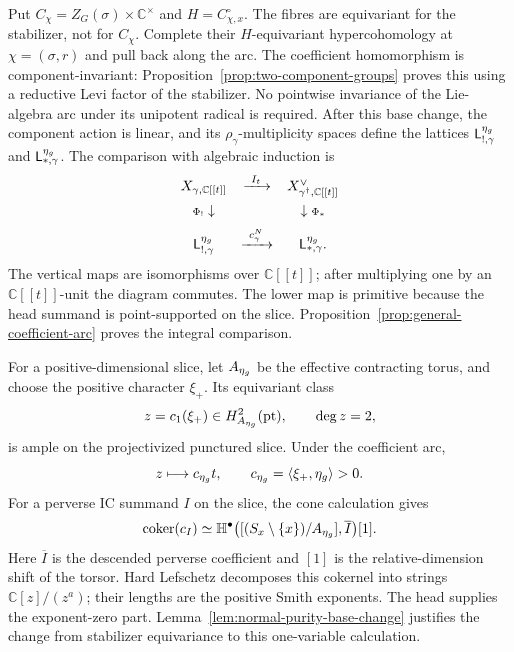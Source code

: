 \documentclass[10pt,a4paper]{amsart}
\newcommand{\C}{\mathbb C}
\newcommand{\A}{\C[[t]]}
\begin{document}
Put $C_\chi=Z_G(\sigma)\times\mathbb C^\times$ and
$H=C_{\chi,x}^\circ$.  The fibres are equivariant for the stabilizer,
not for $C_\chi$.  Complete their $H$-equivariant hypercohomology at
$\chi=(\sigma,r)$ and pull back along the arc.  The coefficient homomorphism
is component-invariant: Proposition~\ref{prop:two-component-groups}
proves this using a reductive Levi factor of the stabilizer.  No
pointwise invariance of the Lie-algebra arc under its unipotent radical
is required.  After this base change,
the component action is linear, and its $\rho_\gamma$-multiplicity
spaces define the lattices
$\mathsf L_{!,\gamma}^{\eta_{\rm g}}$ and
$\mathsf L_{*,\gamma}^{\eta_{\rm g}}$.
The comparison with algebraic induction is
\begin{equation}\label{eq:master-comparison}
\begin{array}{ccc}
 X_{\gamma,\A}&\xrightarrow{\ I_t\ }&X_{\gamma^\dagger,\A}^{\vee}\\[2mm]
 {\scriptstyle\Phi_!}\downarrow&&\downarrow{\scriptstyle\Phi_*}\\[2mm]
 \mathsf L_{!,\gamma}^{\eta_{\rm g}}&
 \xrightarrow{\ c_\gamma^N\ }&
 \mathsf L_{*,\gamma}^{\eta_{\rm g}}.
\end{array}
\end{equation}
The vertical maps are isomorphisms over $\A$; after multiplying one by
an $\A$-unit the diagram commutes.  The lower map is primitive because
the head summand is point-supported on the slice.
Proposition~\ref{prop:general-coefficient-arc} proves the integral
comparison.

For a positive-dimensional slice, let $A_{\eta_{\rm g}}$ be the effective
contracting torus, and choose the
positive character $\xi_+$.  Its equivariant class
\[
 z=c_1(\xi_+)\in H^2_{A_{\eta_{\rm g}}}(\mathrm{pt}),\qquad
 \deg z=2,
\]
is ample on the projectivized punctured slice.  Under the coefficient arc,
\[
 z\longmapsto c_{\eta_{\rm g}}t,\qquad
 c_{\eta_{\rm g}}=\langle\xi_+,\eta_{\rm g}\rangle>0.
\]
For a perverse IC summand $I$ on the slice, the cone calculation gives
\[
 \operatorname{coker}(c_I)
 \simeq\mathbb H^\bullet
 \bigl([(S_x\setminus\{x\})/A_{\eta_{\rm g}}],\overline I\bigr)[1].
\]
Here $\overline I$ is the descended perverse coefficient and $[1]$ is
the relative-dimension shift of the torsor.
Hard Lefschetz decomposes this cokernel into strings
$\mathbb C[z]/(z^a)$; their lengths are the positive Smith exponents.
The head supplies the exponent-zero part.
Lemma~\ref{lem:normal-purity-base-change} justifies the change from
stabilizer equivariance to this one-variable calculation.
\end{document}
